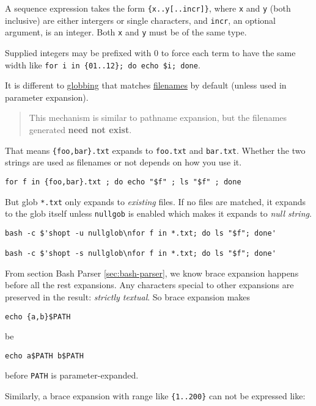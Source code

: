 A sequence expression takes the form \lstinline|{x..y[..incr]}|,
where \lstinline|x| and \lstinline|y| (both inclusive) are either
intergers or single characters, and \lstinline|incr|, an optional
argument, is an integer. Both \lstinline|x| and \lstinline|y| must
be of the same type.

Supplied integers may be prefixed with 0 to force each term to
have the same width like
\lstinline|for i in {01..12}; do echo $i; done|.

It is different to
\href{https://www.gnu.org/software/bash/manual/bash.html#Filename-Expansion}{globbing}
that matches \uline{filenames} by default (unless used in
parameter expansion).

\begin{quotation}
  This mechanism is similar to pathname expansion, but the filenames generated \textbf{need not exist}.
\end{quotation}

That means \lstinline|{foo,bar}.txt| expands to
\lstinline|foo.txt| and \lstinline|bar.txt|. Whether the two
strings are used as filenames or not depends on how you use it.

\begin{lstlisting}
for f in {foo,bar}.txt ; do echo "$f" ; ls "$f" ; done
\end{lstlisting}

But glob \lstinline|*.txt| only expands to \textit{existing} files. If
no files are matched, it expands to the glob itself unless
\lstinline|nullgob| is enabled which makes it expands to
\textit{null string}.

\begin{lstlisting}
bash -c $'shopt -u nullglob\nfor f in *.txt; do ls "$f"; done'

bash -c $'shopt -s nullglob\nfor f in *.txt; do ls "$f"; done'
\end{lstlisting}

From section Bash Parser \ref{sec:bash-parser}, we know brace
expansion happens before all the rest expansions. Any characters
special to other expansions are preserved in the result:
\textit{strictly textual}. So brace expansion makes

\lstinline|echo {a,b}$PATH|

be

\lstinline|echo a$PATH b$PATH|

before \verb|PATH| is parameter-expanded.

Similarly, a brace expansion with range like \lstinline|{1..200}|
can not be expressed like:

